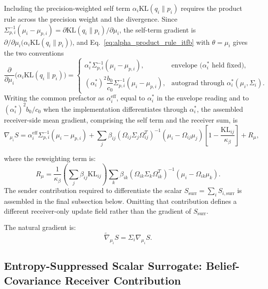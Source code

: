 \documentclass[11pt]{article}
\begin{document}
Including the precision-weighted self term $\alpha_i \mathrm{KL}(q_i \| p_i)$ requires the product rule across the precision weight and the divergence. Since $\Sigma_{p,i}^{-1}(\mu_i - \mu_{p,i}) = \partial \mathrm{KL}(q_i \| p_i)/\partial \mu_i$, the self-term gradient is $\partial/\partial\mu_i\bigl(\alpha_i \mathrm{KL}(q_i \| p_i)\bigr)$, and Eq.~\eqref{eq:alpha_product_rule_itfb} with $\theta = \mu_i$ gives the two conventions
\begin{equation}
\frac{\partial}{\partial \mu_i}\bigl(\alpha_i \mathrm{KL}(q_i \| p_i)\bigr) =
\begin{cases}
\alpha_i^* \Sigma_{p,i}^{-1}(\mu_i - \mu_{p,i}), & \text{envelope ($\alpha_i^*$ held fixed)}, \\[4pt]
(\alpha_i^*)^2 \dfrac{b_0}{c_0} \Sigma_{p,i}^{-1}(\mu_i - \mu_{p,i}), & \text{autograd through } \alpha_i^*(\mu_i, \Sigma_i).
\end{cases}
\end{equation}
Writing the common prefactor as $\alpha_i^{\mathrm{eff}}$, equal to $\alpha_i^*$ in the envelope reading and to $(\alpha_i^*)^2 b_0/c_0$ when the implementation differentiates through $\alpha_i^*$, the assembled receiver-side mean gradient, comprising the self term and the receiver sum, is
\begin{equation}
\boxed{\nabla_{\mu_i} S = \alpha_i^{\mathrm{eff}}\Sigma_{p,i}^{-1}(\mu_i - \mu_{p,i}) + \sum_j \beta_{ij} (\Omega_{ij}\Sigma_j\Omega_{ij}^T)^{-1}(\mu_i - \Omega_{ij}\mu_j) \left[1 - \frac{\mathrm{KL}_{ij}}{\kappa_\beta}\right] + R_\mu,}
\end{equation}

where the reweighting term is:
\begin{equation}
R_\mu = \frac{1}{\kappa_\beta}\left(\sum_j \beta_{ij}\mathrm{KL}_{ij}\right) \sum_k \beta_{ik} (\Omega_{ik}\Sigma_k\Omega_{ik}^T)^{-1}(\mu_i - \Omega_{ik}\mu_k).
\end{equation}
The sender contribution required to differentiate the scalar $S_{\mathrm{surr}}=\sum_i S_{i,\mathrm{surr}}$ is assembled in the final subsection below. Omitting that contribution defines a different receiver-only update field rather than the gradient of $S_{\mathrm{surr}}$.

The natural gradient is:
\begin{equation}
\tilde{\nabla}_{\mu_i} S = \Sigma_i \nabla_{\mu_i} S.
\end{equation}

\subsection*{Entropy-Suppressed Scalar Surrogate: Belief-Covariance Receiver Contribution}
\end{document}

